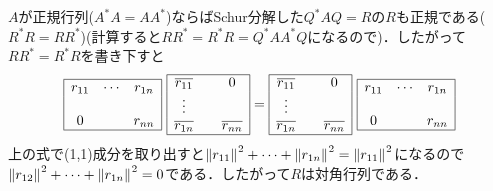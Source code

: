$A$が正規行列($A^{\ast}A=AA^{\ast}$)ならばSchur分解した$Q^{\ast}AQ=R$の$R$も正規である($R^{\ast}R=RR^{\ast}$)(計算すると$RR^{\ast}=R^{\ast}R=Q^{\ast}AA^{\ast}Q$になるので)．したがって$RR^{\ast}=R^{\ast}R$を書き下すと
\begin{equation}
  \begin{array}{|ccc|}
    \hline
    r_{11}&\cdots&r_{1n}\\
    &&\\
    0&&r_{nn}\\\hline
  \end{array}\
  \begin{array}{|ccc|}
    \hline
    {\overline{r_{11}}}&&0\\
    \vdots&&\\
    {\overline{r_{1n}}}&&{\overline{r_{nn}}}\\\hline
  \end{array}=
  \begin{array}{|ccc|}
    \hline
    {\overline{r_{11}}}&&0\\
    \vdots&&\\
    {\overline{r_{1n}}}&&{\overline{r_{nn}}}\\\hline
  \end{array}\
  \begin{array}{|ccc|}
    \hline
    r_{11}&\cdots&r_{1n}\\
    &&\\
    0&&r_{nn}\\\hline
  \end{array}
\end{equation}
上の式で(1,1)成分を取り出すと${{\| {r_{11}}\| }_{}}^2 +\cdots +{{\| {r_{1n}}\| }_{}}^2 = {{\| {r_{11}}\| }_{}}^2$になるので${{\| {r_{12}}\| }_{}}^2 + \cdots +{{\| {r_{1n}}\| }_{}}^2 =0$である．したがって$R$は対角行列である．
